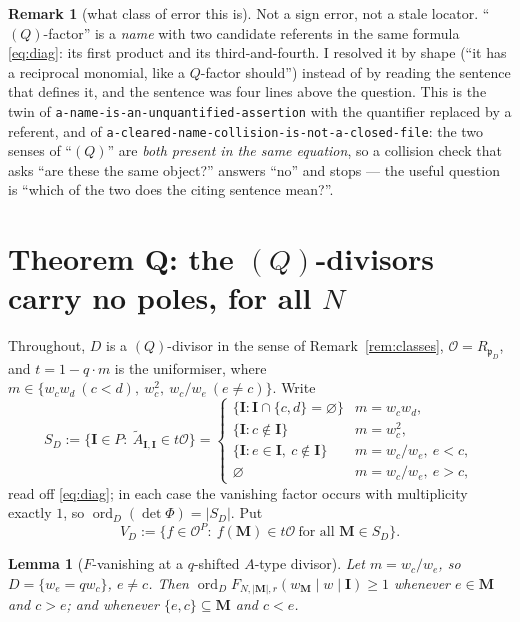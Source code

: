 \documentclass[11pt]{article}
\newtheorem{lem}[thm]{Lemma}
\theoremstyle{definition}
\newtheorem{rem}[thm]{Remark}
\newcommand{\At}{\widetilde{A}}
\newcommand{\bM}{\mathbf{M}}
\newcommand{\bI}{\mathbf{I}}
\newcommand{\ord}{\operatorname{ord}}
\begin{document}
\begin{rem}[what class of error this is]
Not a sign error, not a stale locator.  ``$(Q)$-factor'' is a \emph{name} with
two candidate referents in the same formula \eqref{eq:diag}: its first product
and its third-and-fourth.  I resolved it by shape (``it has a reciprocal
monomial, like a $Q$-factor should'') instead of by reading the sentence that
defines it, and the sentence was four lines above the question.  This is the twin
of \texttt{a-name-is-an-unquantified-assertion} with the quantifier replaced by a
referent, and of \texttt{a-cleared-name-collision-is-not-a-closed-file}: the two
senses of ``$(Q)$'' are \emph{both present in the same equation}, so a collision
check that asks ``are these the same object?'' answers ``no'' and stops --- the
useful question is ``which of the two does the citing sentence mean?''.
\end{rem}

\section{Theorem Q: the \texorpdfstring{$(Q)$}{(Q)}-divisors carry no poles, for all \texorpdfstring{$N$}{N}}
\label{sec:thmQ}

Throughout, $D$ is a $(Q)$-divisor in the sense of Remark~\ref{rem:classes},
$\mathcal{O}=R_{\mathfrak p_D}$, and $t=1-q\cdot m$ is the uniformiser, where
$m\in\{w_cw_d\ (c<d),\ w_c^{2},\ w_c/w_e\ (e\ne c)\}$.  Write
\[
  S_D:=\{\bI\in P:\ \At_{\bI,\bI}\in t\mathcal{O}\}
  =\begin{cases}
   \{\bI:\bI\cap\{c,d\}=\varnothing\} & m=w_cw_d,\\
   \{\bI:c\notin\bI\} & m=w_c^{2},\\
   \{\bI:e\in\bI,\ c\notin\bI\} & m=w_c/w_e,\ e<c,\\
   \varnothing & m=w_c/w_e,\ e>c,
  \end{cases}
\]
read off \eqref{eq:diag}; in each case the vanishing factor occurs with
multiplicity exactly $1$, so $\ord_D(\det\Phi)=|S_D|$.  Put
\[
  V_D:=\{f\in\mathcal{O}^{P}:\ f(\bM)\in t\mathcal{O}\ \text{for all }\bM\in S_D\}.
\]

\begin{lem}[$F$-vanishing at a $q$-shifted $A$-type divisor]\label{lem:fvanish}
Let $m=w_c/w_e$, so $D=\{w_e=qw_c\}$, $e\ne c$.  Then
$\ord_D F_{N,|\bM|,r}(w_{\bM}\mid w\mid\bI)\ge1$ whenever $e\in\bM$ and $c>e$;
and whenever $\{e,c\}\subseteq\bM$ and $c<e$.
\end{lem}
\end{document}
